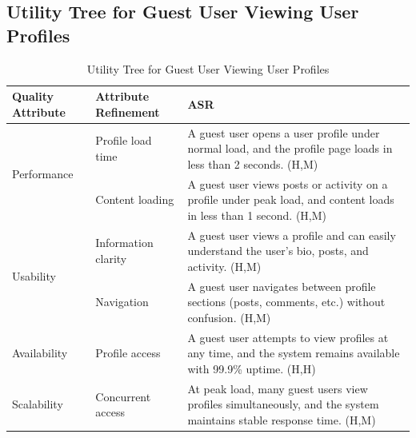 \documentclass{article}
\begin{document}
\subsection{Utility Tree for Guest User Viewing User Profiles}

\begin{table}[H]
    \centering
    \caption{Utility Tree for Guest User Viewing User Profiles}
    \begin{tabular}{|p{3cm}|p{4cm}|p{7cm}|}
        \hline
        \textbf{Quality Attribute} & \textbf{Attribute Refinement}                                                                                                       & \textbf{ASR} \\
        \hline

        \multirow{2}{*}{Performance}
                                   & Profile load time
                                   & A guest user opens a user profile under normal load, and the profile page loads in less than 2 seconds. (H,M)                                      \\
        \cline{2-3}
                                   & Content loading
                                   & A guest user views posts or activity on a profile under peak load, and content loads in less than 1 second. (H,M)                                  \\
        \hline

        \multirow{2}{*}{Usability}
                                   & Information clarity
                                   & A guest user views a profile and can easily understand the user's bio, posts, and activity. (H,M)                                                  \\
        \cline{2-3}
                                   & Navigation
                                   & A guest user navigates between profile sections (posts, comments, etc.) without confusion. (H,M)                                                   \\
        \hline

        Availability
                                   & Profile access
                                   & A guest user attempts to view profiles at any time, and the system remains available with 99.9\% uptime. (H,H)                                     \\
        \hline

        Scalability
                                   & Concurrent access
                                   & At peak load, many guest users view profiles simultaneously, and the system maintains stable response time. (H,M)                                  \\
        \hline


\end{tabular}
\end{table}
\end{document}
